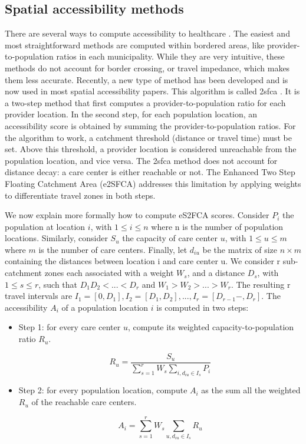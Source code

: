 \subsection{Spatial accessibility methods}

There are several ways to compute accessibility to healthcare \cite{guagliardo_spatial_2004}. The easiest and most straightforward methods are computed within bordered areas, like provider-to-population ratios in each municipality. While they are very intuitive, these methods do not account for border crossing, or travel impedance, which makes them less accurate. Recently, a new type of method has been developed and is now used in most spatial accessibility papers. This algorithm is called \ac{2sfca} \cite{luo_using_2004}. It is a two-step method that first computes a provider-to-population ratio for each provider location. In the second step, for each population location, an accessibility score is obtained by summing the provider-to-population ratios. For the algorithm to work, a catchment threshold (distance or travel time) must be set. Above this threshold, a provider location is considered unreachable from the population location, and vice versa. The \ac{2sfca} method does not account for distance decay: a care center is either reachable or not. The Enhanced Two Step Floating Catchment Area (e2SFCA) \cite{luo_enhanced_2009} addresses this limitation by applying weights to differentiate travel zones in both steps.

We now explain more formally how to compute eS2FCA scores. Consider $P_i$ the population at location $i$, with $1 \leq i \leq n$ where n is the number of population locations. Similarly, consider $S_u$ the capacity of care center $u$, with $1 \leq u \leq m$ where $m$ is the number of care centers. Finally, let $d_{iu}$ be the matrix of size $n \times m$ containing the distances between location i and care center u. We consider r sub-catchment zones each associated with a weight $W_s$, and a distance $D_s$, with $1 \leq s \leq r$, such that $D_1 D_2 < ... < D_r$ and $W_1 > W_2 > ... > W_r$. The resulting r travel intervals are $I_1=[0, D_1], I_2=[D_1, D_2 ], ... ,I_r=[D_{r-1}-,D_r]$. The accessibility $A_i$ of a population location $i$ is computed in two steps:

\begin{itemize}
    \item Step 1: for every care center $u$, compute its weighted capacity-to-population ratio $R_u$.

    \begin{equation}
    R_u =  \frac{S_u}{\sum_{s=1}^{r} W_s \sum_{i, d_{iu} \in I_s} P_i}
    \end{equation}

    \item Step 2: for every population location, compute $A_i$ as the sum all the weighted $R_u$ of the reachable care centers.

    \begin{equation}
    A_i = \sum_{s=1}^{r} W_s \sum_{u, d_{iu} \in I_s} R_u
    \end{equation}
\end{itemize}

